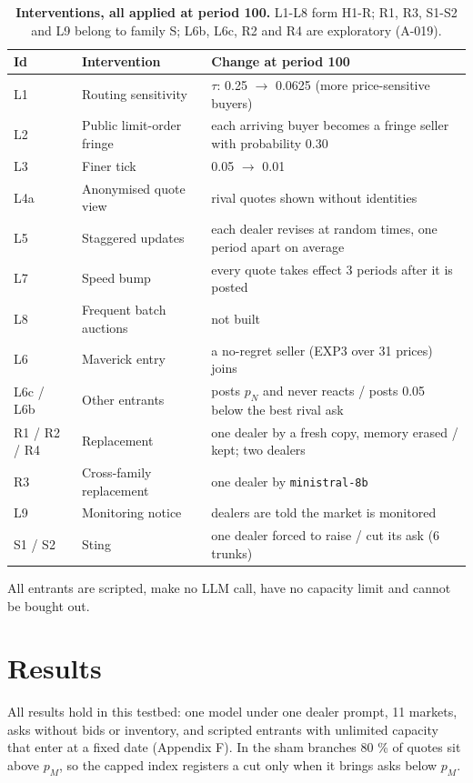\documentclass[11pt,a4paper]{article}
\newif\ifclaimtags
\newcommand{\claim}[1]{\ifclaimtags\textsuperscript{[#1]}\fi}
\begin{document}
%
\begin{table}[htbp]
\centering
\renewcommand{\thetable}{1}
\caption{\textbf{Interventions, all applied at period 100.} L1-L8 form H1-R; R1, R3, S1-S2 and L9 belong to family S; L6b, L6c, R2 and R4 are exploratory (A-019).}
\label{tab:1}
\footnotesize
\setlength{\tabcolsep}{3pt}
%
\begin{tabularx}{\linewidth}{@{}LLL@{}}
\toprule
Id & Intervention & Change at period 100 \\
\midrule
L1 & Routing sensitivity & $\tau$: 0.25 $\rightarrow$ 0.0625 (more price-sensitive buyers) \\
L2 & Public limit-order fringe & each arriving buyer becomes a fringe seller with probability 0.30 \\
L3 & Finer tick & 0.05 $\rightarrow$ 0.01 \\
L4a & Anonymised quote view & rival quotes shown without identities \\
L5 & Staggered updates & each dealer revises at random times, one period apart on average \\
L7 & Speed bump & every quote takes effect 3 periods after it is posted \\
L8 & Frequent batch auctions & not built \\
L6 & Maverick entry & a no-regret seller (EXP3 over 31 prices) joins \\
L6c / L6b & Other entrants & posts $p_N$ and never reacts / posts 0.05 below the best rival ask \\
R1 / R2 / R4 & Replacement & one dealer by a fresh copy, memory erased / kept; two dealers \\
R3 & Cross-family replacement & one dealer by \texttt{ministral-\allowbreak{}8b} \\
L9 & Monitoring notice & dealers are told the market is monitored \\
S1 / S2 & Sting & one dealer forced to raise / cut its ask (6 trunks) \\
\bottomrule
\end{tabularx}
\end{table}

All entrants are scripted, make no LLM call, have no capacity limit and cannot be bought out.

\section{Results}
All results hold in this testbed: one model under one dealer prompt, 11 markets\claim{C3a}, asks without bids or inventory, and scripted entrants with unlimited capacity that enter at a fixed date (Appendix F). In the sham branches 80 \% of quotes sit above $p_M$, so the capped index registers a cut only when it brings asks below $p_M$\claim{C10}.
\end{document}
